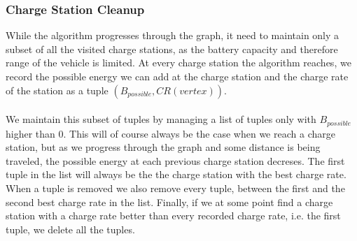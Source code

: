 \subsubsection{Charge Station Cleanup}
While the algorithm progresses through the graph, it need to maintain only a subset of all the visited charge stations, as the battery capacity and therefore range of the vehicle is limited. At every charge station the algorithm reaches, we record the possible energy we can add at the charge station and the charge rate of the station as a tuple $(B_{possible}, CR(vertex))$.
\\
\\
We maintain this subset of tuples by managing a list of tuples only with $B_{possible}$ higher than 0. This will of course always be the case when we reach a charge station, but as we progress through the graph and some distance is being traveled, the possible energy at each previous charge station decreses. The first tuple in the list will always be the the charge station with the best charge rate. When a tuple is removed we also remove every tuple, between the first and the second best charge rate in the list. Finally, if we at some point find a charge station with a charge rate better than every recorded charge rate, i.e. the first tuple, we delete all the tuples.